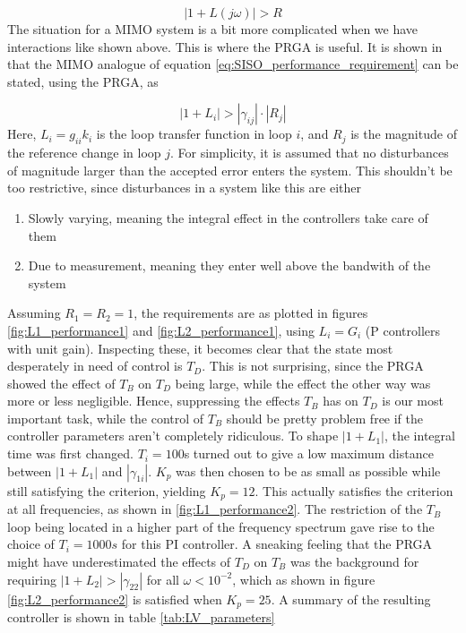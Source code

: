 \documentclass[12pt]{article}
\begin{document}
\begin{equation}
| 1 + L(j \omega) | > R
\label{eq:SISO_performance_requirement}
\end{equation}
The situation for a MIMO system is a bit more complicated when we have interactions like shown above. This is where the PRGA is useful. It is shown in \cite{skogestad} that the MIMO analogue of equation \ref{eq:SISO_performance_requirement} can be stated, using the PRGA, as

\begin{equation}
| 1 + L_i | > | \gamma_{ij} | \cdot |R_j|
\end{equation}
Here, $L_i = g_{ii}k_i$ is the loop transfer function in loop $i$, and $R_j$ is the magnitude of the reference change in loop $j$. For simplicity, it is assumed that no disturbances of magnitude larger than the accepted error enters the system. This shouldn't be too restrictive, since disturbances in a system like this are either
\begin{enumerate}
\item Slowly varying, meaning the integral effect in the controllers take care of them
\item Due to measurement, meaning they enter well above the bandwith of the system
\end{enumerate}
Assuming $R_1 = R_2 = 1$, the requirements are as plotted in figures \ref{fig:L1_performance1} and \ref{fig:L2_performance1}, using $L_i = G_i$ (P controllers with unit gain). Inspecting these, it becomes clear that the state most desperately in need of control is $T_D$. This is not surprising, since the PRGA showed the effect of $T_B$ on $T_D$ being large, while the effect the other way was more or less negligible. Hence, suppressing the effects $T_B$ has on $T_D$ is our most important task, while the control of $T_B$ should be pretty problem free if the controller parameters aren't completely ridiculous. To shape $| 1 + L_1 |$, the integral time was first changed. $T_i = 100$s turned out to give a low maximum distance between $| 1 + L_1 |$ and $| \gamma_{1i} |$. $K_p$ was then chosen to be as small as possible while still satisfying the criterion, yielding $K_p = 12$. This actually satisfies the criterion at all frequencies, as shown in \ref{fig:L1_performance2}. The restriction of the $T_B$ loop being located in a higher part of the frequency spectrum gave rise to the choice of $T_i = 1000s$ for this PI controller. A sneaking feeling that the PRGA might have underestimated the effects of $T_D$ on $T_B$ was the background for requiring $| 1 + L_2 | > | \gamma_{22} |$ for all $\omega < 10^{-2}$, which as shown in figure \ref{fig:L2_performance2} is satisfied when $K_p = 25$. A summary of the resulting controller is shown in table \ref{tab:LV_parameters}
\end{document}
